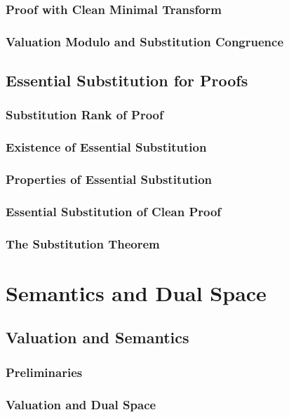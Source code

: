 \documentclass{report}
\begin{document}
    \subsection{Proof with Clean Minimal Transform}
      
    \subsection{Valuation Modulo and Substitution Congruence}
      
\section{Essential Substitution for Proofs}
    \subsection{Substitution Rank of Proof}
      
    \subsection{Existence of Essential Substitution}
      
    \subsection{Properties of Essential Substitution}
      
    \subsection{Essential Substitution of Clean Proof}
      
    \subsection{The Substitution Theorem}
      
\chapter{Semantics and Dual Space}
\section{Valuation and Semantics}
    \subsection{Preliminaries}
      
    \subsection{Valuation and Dual Space}
      
\end{document}
